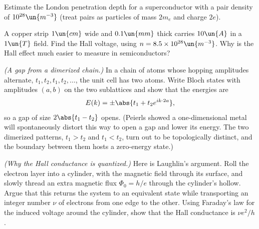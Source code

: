 \begin{problems}
 Estimate the London penetration depth for a superconductor with a pair density of $10^{28}\un{m^{-3}}$ (treat pairs as particles of mass $2m_e$ and charge $2e$).

 A copper strip $1\un{cm}$ wide and $0.1\un{mm}$ thick carries $10\un{A}$ in a $1\un{T}$ field. Find the Hall voltage, using $n = 8.5\times10^{28}\un{m^{-3}}$. Why is the Hall effect much easier to measure in semiconductors?

\core \label{prob:dimer} \emph{(A gap from a dimerized chain.)} In a chain of atoms whose hopping amplitudes alternate, $t_1, t_2, t_1, t_2,\dots$, the unit cell has two atoms. Write Bloch states with amplitudes $(a,b)$ on the two sublattices and show that the energies are
\[
  E(k) = \pm\abs{t_1 + t_2e^{ik\cdot 2a}} ,
\]
so a gap of size $2\abs{t_1 - t_2}$ opens. (Peierls showed a one-dimensional metal will spontaneously distort this way to open a gap and lower its energy. The two dimerized patterns, $t_1>t_2$ and $t_1<t_2$, turn out to be topologically distinct, and the boundary between them hosts a zero-energy state.)

 \emph{(Why the Hall conductance is quantized.)} Here is Laughlin's argument. Roll the electron layer into a cylinder, with the magnetic field through its surface, and slowly thread an extra magnetic flux $\Phi_0 = h/e$ through the cylinder's hollow. Argue that this returns the system to an equivalent state while transporting an integer number $\nu$ of electrons from one edge to the other. Using Faraday's law for the induced voltage around the cylinder, show that the Hall conductance is $\nu e^2/h$.
\end{problems}

\begin{reading}
\end{reading}
